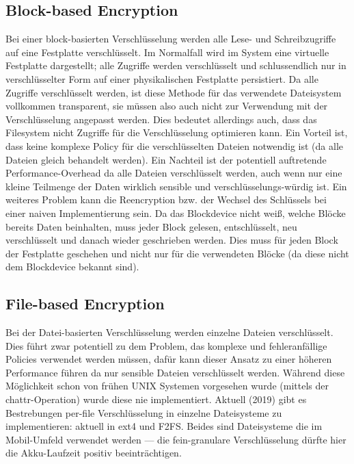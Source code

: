 \subsection{Block-based Encryption}

Bei einer block-basierten Verschlüsselung werden alle Lese- und Schreibzugriffe auf eine Festplatte verschlüsselt. Im Normalfall wird im System eine virtuelle Festplatte dargestellt; alle Zugriffe werden verschlüsselt und schlussendlich nur in verschlüsselter Form auf einer physikalischen Festplatte persistiert. Da alle Zugriffe verschlüsselt werden, ist diese Methode für das verwendete Dateisystem vollkommen transparent, sie müssen also auch nicht zur Verwendung mit der Verschlüsselung angepasst werden. Dies bedeutet allerdings auch, dass das Filesystem nicht Zugriffe für die Verschlüsselung optimieren kann. Ein Vorteil ist, dass keine komplexe Policy für die verschlüsselten Dateien notwendig ist (da alle Dateien gleich behandelt werden). Ein Nachteil ist der potentiell auftretende Performance-Overhead da alle Dateien verschlüsselt werden, auch wenn nur eine kleine Teilmenge der Daten wirklich sensible und verschlüsselungs-würdig ist. Ein weiteres Problem kann die Reencryption bzw. der Wechsel des Schlüssels bei einer naiven Implementierung sein. Da das Blockdevice nicht weiß, welche Blöcke bereits Daten beinhalten, muss jeder Block gelesen, entschlüsselt, neu verschlüsselt und danach wieder geschrieben werden. Dies muss für jeden Block der Festplatte geschehen und nicht nur für die verwendeten Blöcke (da diese nicht dem Blockdevice bekannt sind).

\subsection{File-based Encryption}

Bei der Datei-basierten Verschlüsselung werden einzelne Dateien verschlüsselt. Dies führt zwar potentiell zu dem Problem, das komplexe und fehleranfällige Policies verwendet werden müssen, dafür kann dieser Ansatz zu einer höheren Performance führen da nur sensible Dateien verschlüsselt werden. Während diese Möglichkeit schon von frühen UNIX Systemen vorgesehen wurde (mittels der chattr-Operation) wurde diese nie implementiert. Aktuell (2019) gibt es Bestrebungen per-file Verschlüsselung in einzelne Dateisysteme zu implementieren: aktuell in ext4 und F2FS. Beides sind Dateisysteme die im Mobil-Umfeld verwendet werden --- die fein-granulare Verschlüsselung dürfte hier die Akku-Laufzeit positiv beeinträchtigen.

